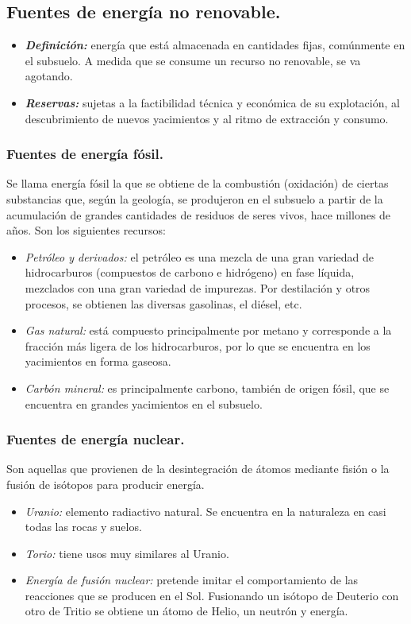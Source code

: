 \subsection{Fuentes de energía no renovable.}
	\begin{itemize}
		\item \textbf{\textit{Definición:}} 
			energía que está almacenada en cantidades fijas, comúnmente en
			el subsuelo. A medida que se consume un recurso no renovable, se va agotando.
		\item \textbf{\textit{Reservas:}}
			sujetas a la factibilidad técnica y económica de su explotación, al
			descubrimiento de nuevos yacimientos y al ritmo de extracción y consumo.
	\end{itemize}
	
		\subsubsection{Fuentes de energía fósil.}
			Se llama energía fósil la que se obtiene de la combustión (oxidación) de ciertas substancias que,
			según la geología, se produjeron en el subsuelo a partir de la acumulación de grandes cantidades de
			residuos de seres vivos, hace millones de años. Son los siguientes recursos:
			\begin{itemize}
				\item \textit{Petróleo y derivados:}
					el petróleo es una mezcla de una gran variedad de hidrocarburos
					(compuestos de carbono e hidrógeno) en fase líquida, mezclados con una gran variedad de
					impurezas. Por destilación y otros procesos, se obtienen las diversas gasolinas, el diésel, etc.
				\item \textit{Gas natural:} 
					está compuesto principalmente por metano y corresponde a la
					fracción más ligera de los hidrocarburos, por lo que se encuentra en los yacimientos en forma
					gaseosa.
				\item \textit{Carbón mineral:}
					es principalmente carbono, también de origen fósil, que
					se encuentra en grandes yacimientos en el subsuelo.
			\end{itemize}
			
		\subsubsection{Fuentes de energía nuclear.}
			Son aquellas que provienen de la desintegración de átomos mediante fisión o la fusión de isótopos para producir energía.
			\begin{itemize}
				\item \textit{Uranio:}
					elemento radiactivo natural. Se encuentra en la naturaleza en casi
					todas las rocas y suelos.
				\item \textit{Torio:}
					tiene usos muy similares al Uranio.
				\item \textit{Energía de fusión nuclear:} 
					pretende imitar el comportamiento de las reacciones que se producen en el Sol. Fusionando un isótopo de Deuterio con otro de Tritio se obtiene un átomo de Helio, un neutrón y energía.
			\end{itemize}
		
